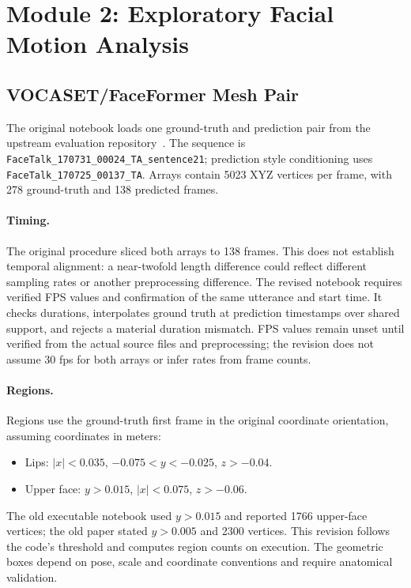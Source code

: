 \documentclass[10pt]{article}
\begin{document}
\section{Module 2: Exploratory Facial Motion Analysis}
\subsection{VOCASET/FaceFormer Mesh Pair}
The original notebook loads one ground-truth and prediction pair from the
upstream evaluation repository~\cite{benchmark}.
The sequence is \texttt{FaceTalk\_170731\_00024\_TA\_sentence21}; prediction style
conditioning uses \texttt{FaceTalk\_170725\_00137\_TA}. Arrays contain 5023 XYZ
vertices per frame, with 278 ground-truth and 138 predicted frames.

\paragraph{Timing.}
The original procedure sliced both arrays to 138 frames. This does not establish
temporal alignment: a near-twofold length difference could reflect different
sampling rates or another preprocessing difference. The revised notebook requires
verified FPS values and confirmation of the same utterance and start time. It checks
durations, interpolates ground truth at prediction timestamps over shared support,
and rejects a material duration mismatch. FPS values remain unset until verified
from the actual source files and preprocessing; the revision does not assume 30 fps
for both arrays or infer rates from frame counts.

\paragraph{Regions.}
Regions use the ground-truth first frame in the original coordinate orientation,
assuming coordinates in meters:
\begin{itemize}
\item Lips: $|x|<0.035$, $-0.075<y<-0.025$, $z>-0.04$.
\item Upper face: $y>0.015$, $|x|<0.075$, $z>-0.06$.
\end{itemize}
The old executable notebook used $y>0.015$ and reported 1766 upper-face vertices;
the old paper stated $y>0.005$ and 2300 vertices. This revision follows the code's
threshold and computes region counts on execution. The geometric boxes depend on
pose, scale and coordinate conventions and require anatomical validation.
\end{document}
